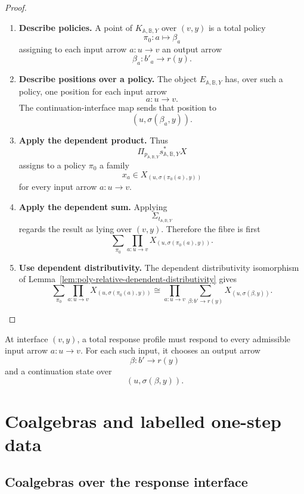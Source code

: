 \begin{proof}
\leavevmode
\begin{enumerate}
\item \textbf{Describe policies.}
A point of \(K_{\mathbb A,\mathbb B,Y}\) over \((v,y)\) is a total policy
\[
\pi_0:a\mapsto\beta_a
\]
assigning to each input arrow \(a:u\to v\) an output arrow
\[
\beta_a:b'_a\to r(y).
\]

\item \textbf{Describe positions over a policy.}
The object \(E_{\mathbb A,\mathbb B,Y}\) has, over such a policy, one position
for each input arrow
\[
a:u\to v.
\]
The continuation-interface map sends that position to
\[
(u,\sigma(\beta_a,y)).
\]

\item \textbf{Apply the dependent product.}
Thus
\[
\Pi_{p_{\mathbb A,\mathbb B,Y}}
s_{\mathbb A,\mathbb B,Y}^{\ast}X
\]
assigns to a policy \(\pi_0\) a family
\[
x_a\in X_{(u,\sigma(\pi_0(a),y))}
\]
for every input arrow \(a:u\to v\).

\item \textbf{Apply the dependent sum.}
Applying
\[
\Sigma_{t_{\mathbb A,\mathbb B,Y}}
\]
regards the result as lying over \((v,y)\).  Therefore the fibre is first
\[
\sum_{\pi_0}
\prod_{a:u\to v}
X_{(u,\sigma(\pi_0(a),y))}.
\]

\item \textbf{Use dependent distributivity.}
The dependent distributivity isomorphism of
Lemma~\ref{lem:poly-relative-dependent-distributivity} gives
\[
\sum_{\pi_0}
\prod_{a:u\to v}
X_{(u,\sigma(\pi_0(a),y))}
\cong
\prod_{a:u\to v}
\sum_{\beta:b'\to r(y)}
X_{(u,\sigma(\beta,y))}.
\]
\end{enumerate}
\end{proof}

\begin{remark}
\label{rem:poly-relative-response-polynomial-meaning}
At interface \((v,y)\), a total response profile must respond to every
admissible input arrow \(a:u\to v\).  For each such input, it chooses an output
arrow
\[
\beta:b'\to r(y)
\]
and a continuation state over
\[
(u,\sigma(\beta,y)).
\]
\end{remark}

\section{Coalgebras and labelled one-step data}
\label{sec:poly-relative-coalgebras}

\subsection{Coalgebras over the response interface}
\label{subsec:poly-relative-coalgebras-over-interface}


